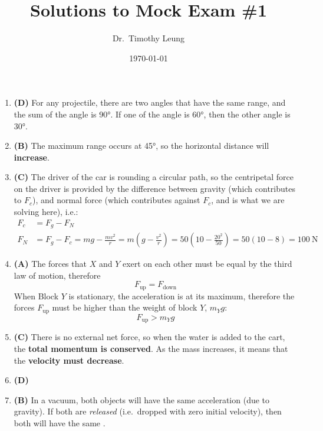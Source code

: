 \documentclass{../../oss-handout}
\title{Solutions to Mock Exam \#1}
\author{Dr.\ Timothy Leung}
\date{\today}
\begin{document}
\thispagestyle{title}
\gentitle

\begin{enumerate}[leftmargin=15pt]
\item\textbf{(D)} For any projectile, there are two angles that have the same
  range, and the sum of the angle is \ang{90}. If one of the angle is \ang{60},
  then the other angle is \ang{30}.

\item\textbf{(B)} The maximum range occurs at \ang{45}, so the horizontal
  distance will \textbf{increase}.

\item\textbf{(C)} The driver of the car is rounding a circular path, so the
  centripetal force on the driver is provided by the difference between gravity
  (which contributes to $F_c$), and normal force (which contributes against
  $F_c$, and is what we are solving here), i.e.:
  \begin{align*}
    F_c &= F_g - F_N\\
    F_N &= F_g - F_c= mg- \frac{mv^2}{r}=m\left( g- \frac{v^2}{r}\right)=
    50\left(10-\frac{20^2}{50}\right)=50(10-8)=\boxed{\SI{100}{\newton}}
  \end{align*}

\item\textbf{(A)} The forces that $X$ and $Y$ exert on each other must be equal
  by the third law of motion, therefore
  \begin{equation*}
    \boxed{F_\text{up}=F_\text{down}}
  \end{equation*}
  When Block $Y$ is stationary, the acceleration is at its maximum, therefore
  the forces $F_\text{up}$ must be higher than the weight of block $Y$, $m_Yg$:
  \begin{equation*}
    \boxed{F_\text{up}>m_Yg}
  \end{equation*}
  
\item\textbf{(C)} There is no external net force, so when the water is added to
  the cart, the \textbf{total momentum is conserved}. As the mass increases, it
  means that the \textbf{velocity must decrease}.

\item\textbf{(D)}

\item\textbf{(B)} In a vacuum, both objects will have the same acceleration
  (due to gravity). If both are \emph{released} (i.e.\ dropped with zero
  initial velocity), then both will have the same .


\end{enumerate}
\end{document}
